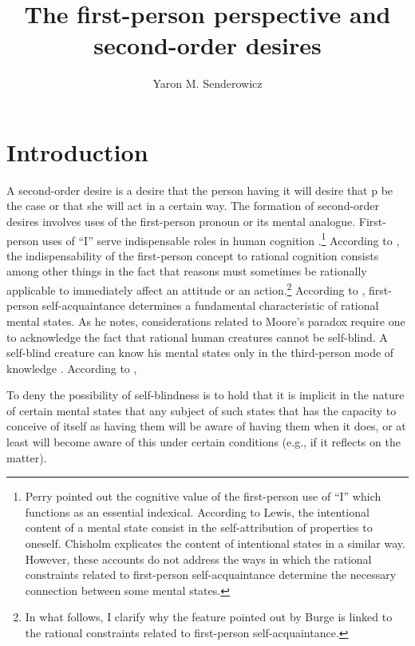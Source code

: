\documentclass[output=paper,colorlinks,citecolor=brown
]{langscibook}
\author{Yaron M. Senderowicz \orcid{}\affiliation{Tel-Aviv University} \orcid{}\affiliation{} 
        \orcid{}\affiliation{}}
\title{The first-person perspective and second-order desires}
\begin{document}
\maketitle

\section{Introduction}

A second-order desire is a desire that the person having it will desire that p be the case or that she will act in a certain way. The formation of second-order desires involves uses of the first-person pronoun or its mental analogue. First-person uses of “I” serve indispensable roles in human cognition \citep{castaneda19661999,castaneda1967indicators,castaneda1968logic,perry1979problem,lewis1979attitudes,chisholm1981first}.\footnote{Perry pointed out the cognitive value of the first-person use of “I” which functions as an essential indexical. According to Lewis, the intentional content of a mental state consist in the self-attribution of properties to oneself. Chisholm explicates the content of intentional states in a similar way. However, these accounts do not address the ways in which the rational constraints related to first-person self-acquaintance determine the necessary connection between some mental states.} According to \citet{burge1998reason}, the indispensability of the first-person concept to rational cognition consists among other things in the fact that reasons must sometimes be rationally applicable to immediately affect an attitude or an action.\footnote{In what follows, I clarify why the feature pointed out by Burge is linked to the rational constraints related to first-person self-acquaintance.} According to \citet{shoemaker1996first}, first-person self-acquaintance determines a fundamental characteristic of rational mental states. As he notes, considerations related to Moore's paradox \citep{moore1903refutation} require one to acknowledge the fact that rational human creatures cannot be self-blind. A self-blind creature can know his mental states only in the third-person mode of knowledge \citep[pp.~30-31]{shoemaker1996first}. According to \citet[p.~31]{shoemaker1996first},

\hfill \break

\begin{adjustwidth}{1cm}{1cm}
    To deny the possibility of self-blindness is to hold that it is implicit in the nature of certain mental states that any  subject of such states that has the capacity to conceive of  itself as having them will be aware of having them when it does, or at least will become aware of this under certain conditions (e.g., if it reflects on the matter).
\end{adjustwidth}
\end{document}
